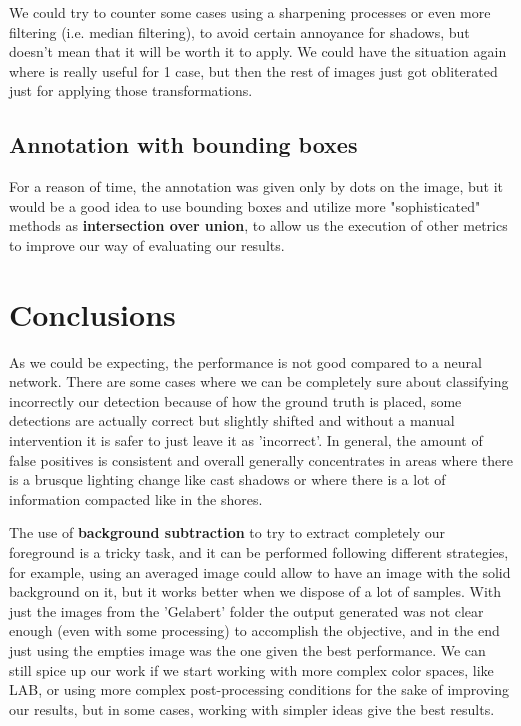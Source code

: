 \documentclass[10pt]{article}
\begin{document}
We could try to counter some cases using a sharpening processes or even more filtering (i.e. median filtering), to avoid certain annoyance for shadows, but doesn't mean that it will be worth it to apply. We could have the situation again where is really useful for 1 case, but then the rest of images just got obliterated just for applying those transformations.


\subsection*{Annotation with bounding boxes}
For a reason of time, the annotation was given only by dots on the image, but it would be a good idea to use bounding boxes and utilize more "sophisticated" methods as \textbf{intersection over union}, to allow us the execution of other metrics to improve our way of evaluating our results.

\section{Conclusions}


As we could be expecting, the performance is not good compared to a neural network. There are some cases where we can be completely sure about classifying incorrectly our detection because of how the ground truth is placed, some detections are actually correct but slightly shifted and without a manual intervention it is safer to just leave it as 'incorrect'. In general, the amount of false positives is consistent and overall  generally concentrates in areas where there is a brusque lighting change like cast shadows or where there is a lot of information compacted like in the shores.\newline

The use of \textbf{background subtraction} to try to extract completely our foreground is a tricky task, and it can be performed following different strategies, for example, using an averaged image could allow to have an image with the solid background on it, but it works better when we dispose of a lot of samples. With just the images from the 'Gelabert' folder the output generated was not clear enough (even with some processing) to accomplish the objective, and in the end just using the empties image was the one given the best performance. We can still spice up our work if we start working with more complex color spaces, like LAB, or using more complex post-processing conditions for the sake of improving our results, but in some cases, working with simpler ideas give the best results.\newline
\end{document}

